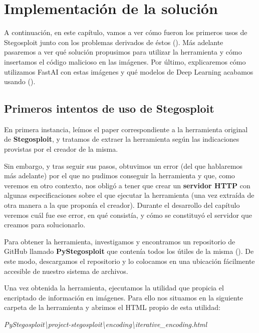\chapter{Implementación de la solución}
\label{ch:stego}

A continuación, en este capítulo, vamos a ver cómo fueron los primeros usos de Stegosploit junto con los problemas derivados de éstos (\cite{stegosploit}). Más adelante pasaremos a ver qué solución propusimos para utilizar la herramienta y cómo insertamos el código malicioso en las imágenes. Por último, explicaremos cómo utilizamos FastAI con estas imágenes y qué modelos de Deep Learning acabamos usando (\cite{fastai}). %

\section{Primeros intentos de uso de Stegosploit}
\label{sec:stego_1}

En primera instancia, leímos el paper correspondiente a la herramienta original de \textbf{Stegosploit}, y tratamos de extraer la herramienta según las indicaciones provistas por el creador de la misma.

Sin embargo, y tras seguir sus pasos, obtuvimos un error (del que hablaremos más adelante) por el que no pudimos conseguir la herramienta y que, como veremos en otro contexto, nos obligó a tener que crear un \textbf{servidor HTTP} con algunas especificaciones sobre el que ejecutar la herramienta (una vez extraída de otra manera a la que proponía el creador). Durante el desarrollo del capítulo veremos cuál fue ese error, en qué consistía, y cómo se constituyó el servidor que creamos para solucionarlo.

Para obtener la herramienta, investigamos y encontramos un repositorio de GitHub llamado \textbf{PyStegosploit} que contenía todos los útiles de la misma (\cite{pystegosploit}). De este modo, descargamos el repositorio y lo colocamos en una ubicación fácilmente accesible de nuestro sistema de archivos.

Una vez obtenida la herramienta, ejecutamos la utilidad que propicia el encriptado de información en imágenes. Para ello nos situamos en la siguiente carpeta de la herramienta y abrimos el HTML propio de esta utilidad:

\begin{center}
\textit{PyStegosploit\textbackslash{project-stegosploit}\textbackslash{encoding}\textbackslash{iterative\_encoding.html}}
\end{center}

